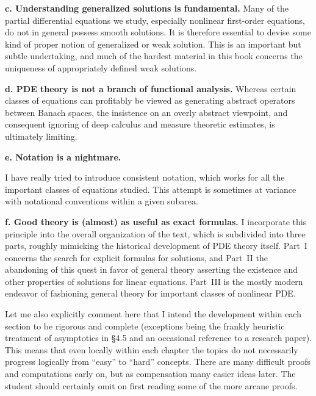 \clearpage
\noindent\textbf{c. Understanding generalized solutions is fundamental.}
Many of the partial differential equations we study, especially nonlinear
first-order equations, do not in general possess smooth solutions. It is
therefore essential to devise some kind of proper notion of generalized or
weak solution. This is an important but subtle undertaking, and much of the
hardest material in this book concerns the uniqueness of appropriately
defined weak solutions.

\noindent\textbf{d. PDE theory is not a branch of functional analysis.}
Whereas certain classes of equations can profitably be viewed as generating
abstract operators between Banach spaces, the insistence on an overly abstract
viewpoint, and consequent ignoring of deep calculus and measure theoretic
estimates, is ultimately limiting.

\noindent\textbf{e. Notation is a nightmare.}

I have really tried to introduce consistent notation, which works for all the
important classes of equations studied. This attempt is sometimes at variance
with notational conventions within a given subarea.

\noindent\textbf{f. Good theory is (almost) as useful as exact formulas.}
I incorporate this principle into the overall organization of the text, which
is subdivided into three parts, roughly mimicking the historical development
of PDE theory itself. Part~I concerns the search for explicit formulas for
solutions, and Part~II the abandoning of this quest in favor of general theory
asserting the existence and other properties of solutions for linear equations.
Part~III is the mostly modern endeavor of fashioning general theory for
important classes of nonlinear PDE.

Let me also explicitly comment here that I intend the development within each
section to be rigorous and complete (exceptions being the frankly heuristic
treatment of asymptotics in \S4.5 and an occasional reference to a research
paper).%
This means that even locally within each chapter the topics do not
necessarily progress logically from ``easy'' to ``hard'' concepts. There are
many difficult proofs and computations early on, but as compensation many
easier ideas later. The student should certainly omit on first reading some
of the more arcane proofs.

